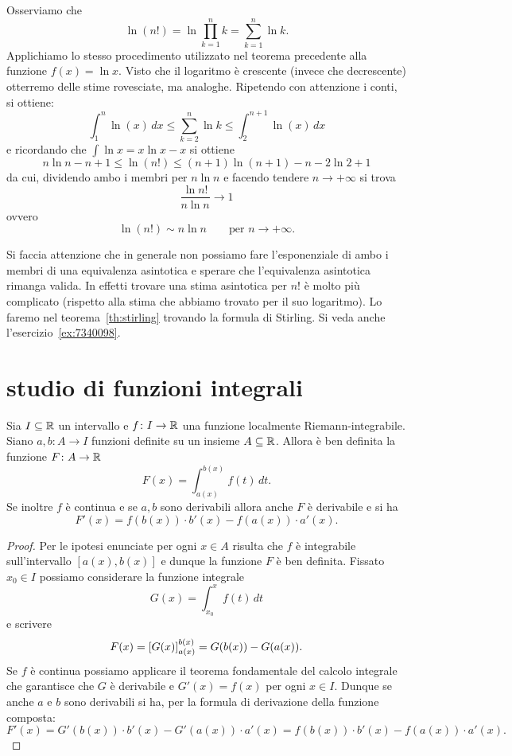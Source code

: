 \begin{example}
\label{ex:498124}%
%
%
Osserviamo che
\[
  \ln (n!) = \ln \prod_{k=1}^n k = \sum_{k=1}^n \ln k.
\]
Applichiamo lo stesso procedimento utilizzato nel teorema precedente alla
funzione $f(x) = \ln x$. Visto che il logaritmo è crescente
(invece che decrescente) otterremo delle stime rovesciate, ma analoghe.
 Ripetendo con attenzione i conti, si ottiene:
\[
    \int_1^n \ln(x)\, dx \le  \sum_{k=2}^n \ln k \le \int_2^{n+1} \ln(x) \, dx
\]
e ricordando che $\int \ln x = x \ln x - x$ si ottiene
\[
  n \ln n - n + 1 \le \ln(n!) \le (n+1) \ln (n+1) - n - 2\ln 2 + 1
\]
da cui, dividendo ambo i membri per $n \ln n$ e facendo tendere $n\to +\infty$ si trova
\[
 \frac{\ln n!}{n \ln n}\to 1
\]
ovvero
\[
  \ln (n!) \sim n \ln n \qquad \text{per $n\to +\infty$.}
\]

Si faccia attenzione che in generale non possiamo fare l'esponenziale di ambo i membri di una equivalenza asintotica
e sperare che l'equivalenza asintotica rimanga valida.
In effetti trovare una stima asintotica per $n!$ è molto più complicato (rispetto alla stima che abbiamo 
trovato per il suo logaritmo).
Lo faremo nel teorema~\ref{th:stirling} trovando la formula di Stirling.
Si veda anche l'esercizio~\ref{ex:7340098}.

\end{example}

\section{studio di funzioni integrali}

\begin{theorem}
Sia $I\subseteq {\mathbb R}$ un intervallo e $f\colon I \to {\mathbb R}$
una funzione localmente Riemann-integrabile.
Siano $a,b\colon A \to I$ funzioni definite
su un insieme $A \subseteq {\mathbb R}$.
Allora è ben definita la funzione $F\colon A \to {\mathbb R}$
\[
  F(x) = \int_{a(x)}^{b(x)} f(t)\, dt.
\]
Se inoltre $f$ è continua e se $a,b$ sono derivabili
allora anche $F$ è derivabile e si ha
\[
  F'(x) = f(b(x)) \cdot b'(x) - f(a(x)) \cdot a'(x).
\]
\end{theorem}
%
\begin{proof}
Per le ipotesi enunciate per ogni $x\in A$ risulta
che $f$ è integrabile sull'intervallo $[a(x),b(x)]$
e dunque la funzione $F$ è ben definita.
Fissato $x_0\in I$
possiamo considerare la funzione integrale
\[
  G(x) = \int_{x_0}^x f(t)\, dt
\]
e scrivere
\[
  F(x)
    = {\left[ G(x) \right]}_{a(x)}^{b(x)}
    = G(b(x)) - G(a(x)).
\]
Se $f$ è continua possiamo applicare il
teorema fondamentale del calcolo integrale
che garantisce che $G$ è derivabile e $G'(x) = f(x)$
per ogni $x\in I$. Dunque se anche $a$ e $b$
sono derivabili si ha, per la formula di derivazione
della funzione composta:
\[
F'(x)
= G'(b(x)) \cdot b'(x) - G'(a(x)) \cdot a'(x)
= f(b(x)) \cdot b'(x) - f(a(x)) \cdot a'(x).
\]
\end{proof}

